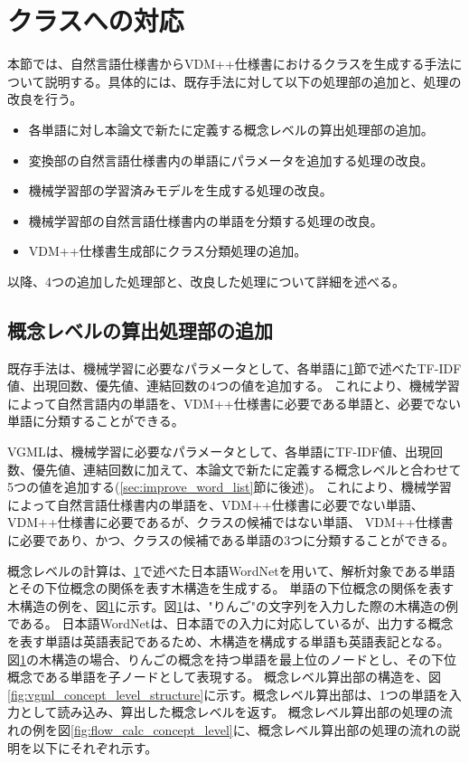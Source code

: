 \section{クラスへの対応}
本節では、自然言語仕様書からVDM++仕様書におけるクラスを生成する手法について説明する。具体的には、既存手法に対して以下の処理部の追加と、処理の改良を行う。

\begin{itemize}
    \item 各単語に対し本論文で新たに定義する概念レベルの算出処理部の追加。
    \item 変換部の自然言語仕様書内の単語にパラメータを追加する処理の改良。
    \item 機械学習部の学習済みモデルを生成する処理の改良。
    \item 機械学習部の自然言語仕様書内の単語を分類する処理の改良。
    \item VDM++仕様書生成部にクラス分類処理の追加。
\end{itemize}

以降、4つの追加した処理部と、改良した処理について詳細を述べる。

\subsection{概念レベルの算出処理部の追加}
\label{sec:part_calc_concept_level}
既存手法は、機械学習に必要なパラメータとして、各単語に\ref{}節で述べたTF-IDF値、出現回数、優先値、連結回数の4つの値を追加する。
これにより、機械学習によって自然言語内の単語を、VDM++仕様書に必要である単語と、必要でない単語に分類することができる。

VGMLは、機械学習に必要なパラメータとして、各単語にTF-IDF値、出現回数、優先値、連結回数に加えて、本論文で新たに定義する概念レベルと合わせて5つの値を追加する(\ref{sec:improve_word_list}節に後述)。
これにより、機械学習によって自然言語仕様書内の単語を、VDM++仕様書に必要でない単語、VDM++仕様書に必要であるが、クラスの候補ではない単語、
VDM++仕様書に必要であり、かつ、クラスの候補である単語の3つに分類することができる。

概念レベルの計算は、\ref{}で述べた日本語WordNetを用いて、解析対象である単語とその下位概念の関係を表す木構造を生成する。
単語の下位概念の関係を表す木構造の例を、図\ref{}に示す。図\ref{}は、"りんご"の文字列を入力した際の木構造の例である。
日本語WordNetは、日本語での入力に対応しているが、出力する概念を表す単語は英語表記であるため、木構造を構成する単語も英語表記となる。
図\ref{}の木構造の場合、りんごの概念を持つ単語を最上位のノードとし、その下位概念である単語を子ノードとして表現する。
概念レベル算出部の構造を、図\ref{fig:vgml_concept_level_structure}に示す。概念レベル算出部は、1つの単語を入力として読み込み、算出した概念レベルを返す。
概念レベル算出部の処理の流れの例を図\ref{fig:flow_calc_concept_level}に、概念レベル算出部の処理の流れの説明を以下にそれぞれ示す。

